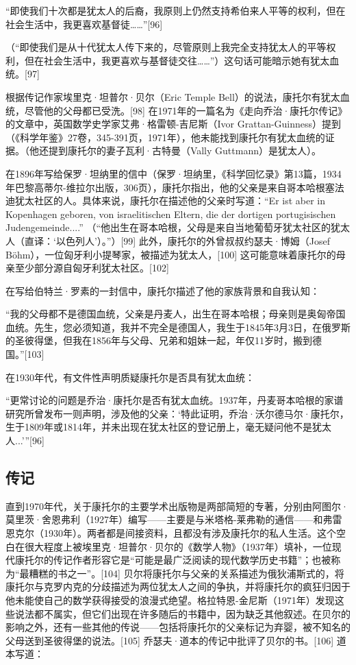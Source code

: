 “即使我们十次都是犹太人的后裔，我原则上仍然支持希伯来人平等的权利，但在社会生活中，我更喜欢基督徒……”[96]

（“即使我们是从十代犹太人传下来的，尽管原则上我完全支持犹太人的平等权利，但在社会生活中，我更喜欢与基督徒交往……”）这句话可能暗示她有犹太血统。[97]

根据传记作家埃里克·坦普尔·贝尔（Eric Temple Bell）的说法，康托尔有犹太血统，尽管他的父母都已受洗。[98] 在1971年的一篇名为《走向乔治·康托尔传记》的文章中，英国数学史学家艾弗·格雷顿-吉尼斯（Ivor Grattan-Guinness）提到（《科学年鉴》27卷，345-391页，1971年），他未能找到康托尔有犹太血统的证据。（他还提到康托尔的妻子瓦利·古特曼（Vally Guttmann）是犹太人）。

在1896年写给保罗·坦纳里的信中（保罗·坦纳里，《科学回忆录》第13篇，1934年巴黎高蒂尔-维拉尔出版，306页），康托尔指出，他的父亲是来自哥本哈根塞法迪犹太社区的人。具体来说，康托尔在描述他的父亲时写道：“Er ist aber in Kopenhagen geboren, von israelitischen Eltern, die der dortigen portugisischen Judengemeinde....” （“他出生在哥本哈根，父母是来自当地葡萄牙犹太社区的犹太人（直译：‘以色列人’）。”）[99] 此外，康托尔的外曾叔叔约瑟夫·博姆（Josef Böhm），一位匈牙利小提琴家，被描述为犹太人，[100] 这可能意味着康托尔的母亲至少部分源自匈牙利犹太社区。[102]

在写给伯特兰·罗素的一封信中，康托尔描述了他的家族背景和自我认知：

“我的父母都不是德国血统，父亲是丹麦人，出生在哥本哈根；母亲则是奥匈帝国血统。先生，您必须知道，我并不完全是德国人，我生于1845年3月3日，在俄罗斯的圣彼得堡，但我在1856年与父母、兄弟和姐妹一起，年仅11岁时，搬到德国。”[103]

在1930年代，有文件性声明质疑康托尔是否具有犹太血统：

“更常讨论的问题是乔治·康托尔是否有犹太血统。1937年，丹麦哥本哈根的家谱研究所曾发布一则声明，涉及他的父亲：‘特此证明，乔治·沃尔德马尔·康托尔，生于1809年或1814年，并未出现在犹太社区的登记册上，毫无疑问他不是犹太人...’”[96]
\subsection{传记}  
直到1970年代，关于康托尔的主要学术出版物是两部简短的专著，分别由阿图尔·莫里茨·舍恩弗利（1927年）编写——主要是与米塔格-莱弗勒的通信——和弗雷恩克尔（1930年）。两者都是间接资料，且都没有涉及康托尔的私人生活。这个空白在很大程度上被埃里克·坦普尔·贝尔的《数学人物》（1937年）填补，一位现代康托尔的传记作者形容它是“可能是最广泛阅读的现代数学历史书籍”；也被称为“最糟糕的书之一”。[104] 贝尔将康托尔与父亲的关系描述为俄狄浦斯式的，将康托尔与克罗内克的分歧描述为两位犹太人之间的争执，并将康托尔的疯狂归因于他未能使自己的数学获得接受的浪漫式绝望。格拉特恩-金尼斯（1971年）发现这些说法都不属实，但它们出现在许多随后的书籍中，因为缺乏其他叙述。在贝尔的影响之外，还有一些其他的传说——包括将康托尔的父亲标记为弃婴，被不知名的父母送到圣彼得堡的说法。[105] 乔瑟夫·道本的传记中批评了贝尔的书。[106] 道本写道：

